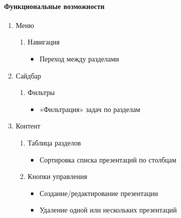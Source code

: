 \paragraph{Функциональные возможности}
\begin{enumerate}
  \item Меню
  \begin{enumerate}
    \item Навигация
    \begin{itemize}
      \item Переход между разделами
    \end{itemize}
  \end{enumerate}

  \item Сайдбар
  \begin{enumerate}
    \item Фильтры
    \begin{itemize}
      \item «Фильтрация» задач по разделам
    \end{itemize}
  \end{enumerate}

  \item Контент
    \begin{enumerate}
      \item Таблица разделов
      \begin{itemize}
        \item Сортировка списка презентаций по столбцам
      \end{itemize}

      \item Кнопки управления
        \begin{itemize}
          \item Создание/редактирование презентации
          \item Удаление одной или нескольких презентаций
        \end{itemize}
    \end{enumerate}
\end{enumerate}
